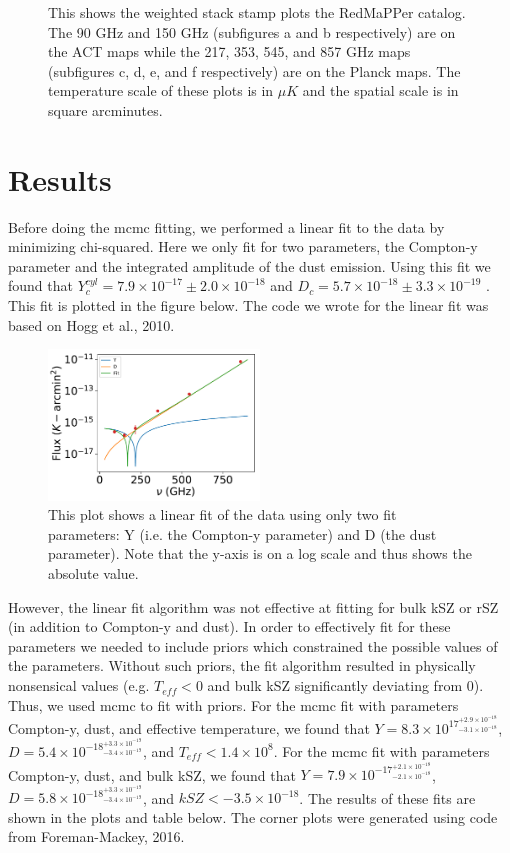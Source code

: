 \documentclass{princeton_astro_thesis}
\begin{document}
\begin{figure}[ht]
\begin{subfigure}[b]{0.1\linewidth}
    \caption{\label{fig:fig3}}
  \end{subfigure}
  \caption{This shows the weighted stack stamp plots the RedMaPPer catalog. The 90 GHz and 150 GHz (subfigures a and b respectively) are on the ACT maps while the 217, 353, 545, and 857 GHz maps (subfigures c, d, e, and f respectively) are on the Planck maps. The temperature scale of these plots is in $\mu K$ and the spatial scale is in square arcminutes.}
\end{figure}
\chapter{Results}
Before doing the mcmc fitting, we performed a linear fit to the data by minimizing chi-squared. Here we only fit for two parameters, the Compton-y parameter and the integrated amplitude of the dust emission. Using this fit we found that $Y^{cyl}_{c}=7.9\times10^{-17}\pm 2.0\times10^{-18}$ and $D_c=5.7\times10^{-18}\pm 3.3\times10^{-19}$ . This fit is plotted in the figure below. The code we wrote for the linear fit was based on Hogg et al., 2010.

\begin{figure}[h]
\centering
\includegraphics[width=0.5\textwidth]{../redmapper_apfluxes_fitlog.pdf}
\caption{This plot shows a linear fit of the data using only two fit parameters: Y (i.e. the Compton-y parameter) and D (the dust parameter). Note that the y-axis is on a log scale and thus shows the absolute value.}
\end{figure}

\par However, the linear fit algorithm was not effective at fitting for bulk kSZ or rSZ (in addition to Compton-y and dust). In order to effectively fit for these parameters we needed to include priors which constrained the possible values of the parameters. Without such priors, the fit algorithm resulted in physically nonsensical values (e.g. $T_{eff}<0$ and bulk kSZ significantly deviating from 0). Thus, we used mcmc to fit with priors. For the mcmc fit with parameters Compton-y, dust, and effective temperature, we found that $Y=8.3\times10^{17^{+2.9\times10^{-18}}_{-3.1\times10^{-18}}}$, $D=5.4\times10^{-18^{+3.3\times10^{-19}}_{-3.4\times10^{-19}}}$, and $T_{eff}<1.4\times10^8$. For the mcmc fit with parameters Compton-y, dust, and bulk kSZ, we found that $Y=7.9\times10^{-17^{+2.1\times10^{-18}}_{-2.1\times10^{-18}}}$, $D=5.8\times10^{-18^{+3.3\times10^{-19}}_{-3.4\times10^{-19}}}$, and $kSZ<-3.5\times10^{-18}$. The results of these fits are shown in the plots and table below. The corner plots were generated using code from Foreman-Mackey, 2016. 
\end{document}
